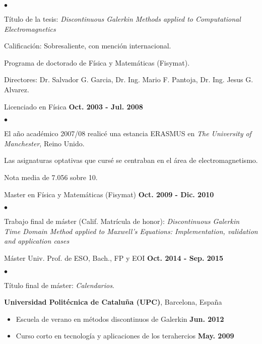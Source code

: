\documentclass[margin,line]{res}
\newenvironment{list2}{
  \begin{list}{$\bullet$}{%
      \setlength{\itemsep}{0in}
      \setlength{\parsep}{0in} \setlength{\parskip}{0in}
      \setlength{\topsep}{0in} \setlength{\partopsep}{0in} 
      \setlength{\leftmargin}{0.2in}}}{\end{list}}
\begin{document}
\begin{resume}
\begin{itemize}
\begin{list2}
  \item[-] Título de la tesis: {\it Discontinuous Galerkin Methods applied to Computational Electromagnetics}
  \item[-] Calificación: Sobresaliente, con mención internacional.
  \item[-] Programa de doctorado de Física y Matemáticas (Fisymat).
  \item[-] Directores:  Dr. Salvador G. Garcia, Dr. Ing. Mario F. Pantoja, Dr. Ing. Jesus G. Alvarez.
 \end{list2}
\vspace*{.1in}
\item Licenciado en Física  \hfill {\raggedleft \bf Oct. 2003 - Jul. 2008}
 \begin{list2}
  \item[-] El año académico 2007/08 realicé una estancia ERASMUS en {\it The University of Manchester}, Reino Unido.
  \item[-] Las asignaturas optativas que cursé se centraban en el área de  electromagnetismo.
  \item[-] Nota media de 7.056 sobre 10. 
 \end{list2}
\vspace*{.1in}
 \item  Master en Física y Matemáticas (Fisymat) \hfill {\raggedleft \bf Oct. 2009 - Dic. 2010}
 \begin{list2}
  \item[-] Trabajo final de máster (Calif. Matrícula de honor): {\it Discontinuous Galerkin Time
  Domain Method applied to Maxwell’s Equations: Implementation, validation and application cases}
 \end{list2}
\vspace*{.1in}
 \item Máster Univ. Prof. de ESO, Bach., FP y EOI \hfill {\raggedleft \bf Oct. 2014 - Sep. 2015}
 \begin{list2}
  \item[-] Título final de máster: \textit{Calendarios}.
 \end{list2}
\end{itemize}

\begin{minipage}{\textwidth}
{\bf Universidad Politécnica de Cataluña (UPC)}, Barcelona, España\\
\vspace*{-.1in}
\begin{itemize}
\item Escuela de verano en métodos discontinuos de Galerkin  \hfill {\bf Jun. 2012}
\item Curso corto en tecnología y aplicaciones de los terahercios \hfill {\bf May. 2009}
\end{itemize}
\end{minipage}


\end{resume}
\end{document}
